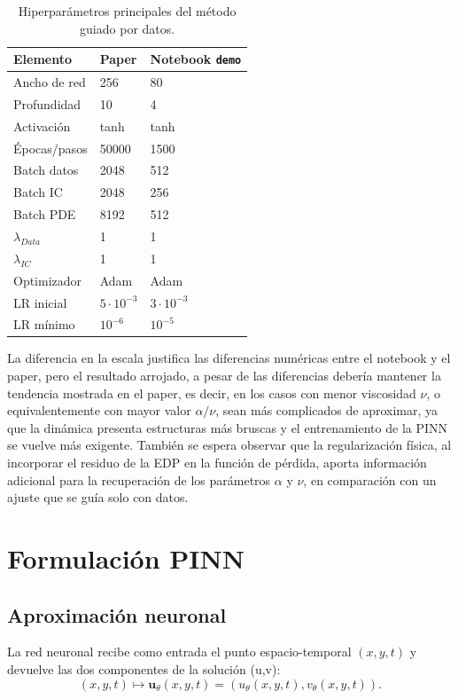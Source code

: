 \documentclass[10pt,letterpaper,twocolumn]{article}
\begin{document}
\begin{table}[H]
\centering
\caption{Hiperparámetros principales del método guiado por datos.}
\begin{tabularx}{\columnwidth}{lXX}
\toprule
Elemento & Paper & Notebook \texttt{demo} \\
\midrule
Ancho de red & 256 & 80 \\
Profundidad & 10 & 4 \\
Activación & tanh & tanh \\
Épocas/pasos & 50000 & 1500 \\
Batch datos & 2048 & 512 \\
Batch IC & 2048 & 256 \\
Batch PDE & 8192 & 512 \\
$\lambda_{Data}$ & 1 & 1 \\
$\lambda_{IC}$ & 1 & 1 \\
Optimizador & Adam & Adam \\
LR inicial & $5\cdot10^{-3}$ & $3\cdot10^{-3}$ \\
LR mínimo & $10^{-6}$ & $10^{-5}$ \\
\bottomrule
\end{tabularx}
\end{table}
La diferencia en la escala justifica las diferencias numéricas entre el notebook y el paper, pero el resultado arrojado, a pesar de las diferencias debería mantener la tendencia mostrada en el paper, es decir, en los casos con menor viscosidad $\nu$, o equivalentemente con mayor valor $\alpha/\nu$, sean más complicados de aproximar, ya que la dinámica presenta estructuras más bruscas y el entrenamiento de la PINN se vuelve más exigente. También se espera observar que la regularización física, al incorporar el residuo de la EDP en la función de pérdida, aporta información adicional para la recuperación de los parámetros $\alpha$ y $\nu$, en comparación con un ajuste que se guía solo con datos.

\section{Formulación PINN}

\subsection{Aproximación neuronal}

La red neuronal recibe como entrada el punto espacio-temporal $(x,y,t)$ y devuelve las dos componentes de la solución (u,v):
\begin{equation}
    (x,y,t)\longmapsto \mathbf{u}_\theta(x,y,t)=(u_\theta(x,y,t),v_\theta(x,y,t)).
\end{equation}
\end{document}
